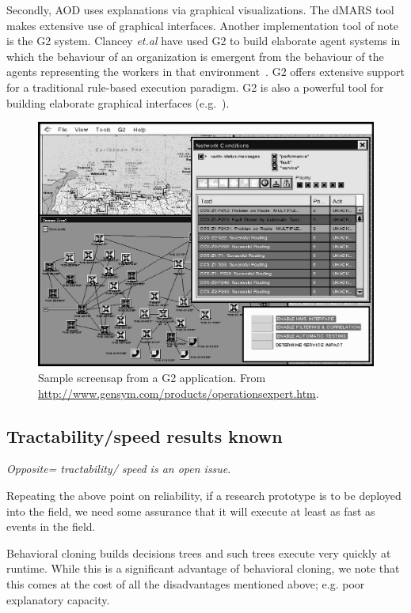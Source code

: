 Secondly, AOD uses explanations via graphical visualizations. The
dMARS tool makes extensive use of graphical interfaces. Another
implementation tool of note is the G2 system. Clancey {\em et.al}
have used G2 to build elaborate agent systems in which the
behaviour of an organization is emergent from the behaviour of the
agents representing the workers in that
environment~\cite{Clancey96a}. G2 offers extensive support for a
traditional rule-based execution paradigm. G2 is also a powerful
tool for building elaborate graphical interfaces (e.g.~).

\begin{figure}[!h]
\centerline{\includegraphics[width=4.5in]{g2.eps}} \caption{Sample screensap
from a G2 application. From\newline
\protect\url{http://www.gensym.com/products/operationsexpert.htm}.}\label{fig:g2}
\end{figure}

\subsection{Tractability/speed results known}\label{sec:speed}

{\em Opposite= tractability/ speed is an open issue}.

Repeating the above point on reliability, if a research prototype
is to be deployed into the field, we need some assurance that it
will execute at least as fast as events in the field.

Behavioral cloning builds decisions trees and such trees execute
very quickly at runtime. While this is a significant advantage of
behavioral cloning, we note that this comes at the cost of all the
disadvantages mentioned above; e.g. poor explanatory capacity.

